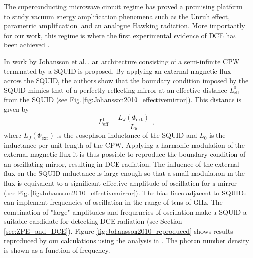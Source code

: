 The superconducting microwave circuit regime has proved a promising platform to study vacuum energy amplification phenomena \cite{Nation2011} such as the Unruh effect, parametric amplification, and an analogue Hawking radiation. More importantly for our work, this regime is where the first experimental evidence of DCE has been achieved \cite{Wilson2011_ObservationDCE}. 

In work by Johansson et al.\,\cite{Johansson2009, Johansson2010}, an architecture consisting of a semi-infinite CPW terminated by a SQUID is proposed. By applying an external magnetic flux across the SQUID, the authors show that the boundary condition imposed by the SQUID mimics that of a perfectly reflecting mirror at an effective distance $L^0_{\text{eff}}$ from the SQUID (see Fig.\,\ref{fig:Johansson2010_effectivemirror}). This distance is given by
%
\begin{equation}\label{eq:squid_inductance}
    L^0_{\text{eff}} = \frac{L_J(\Phi_{\text{ext}})}{L_0} \, \, ,
\end{equation}
%
where $L_J(\Phi_{\text{ext}})$ is the Josephson inductance of the SQUID and $L_0$ is the inductance per unit length of the CPW. Applying a harmonic modulation of the external magnetic flux it is thus possible to reproduce the boundary condition of an oscillating mirror, resulting in DCE radiation. The influence of the external flux on the SQUID inductance is large enough so that a small modulation in the flux is equivalent to a significant effective amplitude of oscillation for a mirror 
(see Fig.\,\ref{fig:Johansson2010_effectivemirror}). 
The bias lines adjacent to SQUIDs can implement frequencies of oscillation in the range of tens of GHz. The combination of "large" amplitudes and frequencies of oscillation make a SQUID a suitable candidate for detecting DCE radiation (see Section \ref{sec:ZPE_and_DCE}). 
Figure \ref{fig:Johansson2010_reproduced} shows results reproduced by our calculations using the analysis in \cite{Johansson2010}. 
The photon number density is shown as a function of frequency.
%
